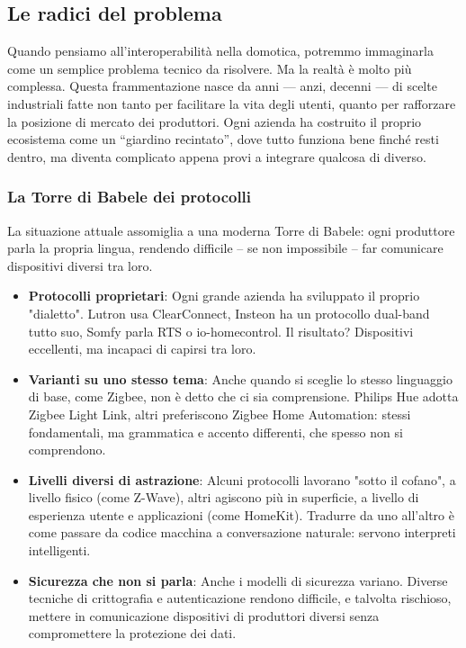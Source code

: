 \subsection{Le radici del problema}
Quando pensiamo all’interoperabilità nella domotica, potremmo immaginarla come un semplice problema tecnico da risolvere. Ma la realtà è molto più complessa. Questa frammentazione nasce da anni — anzi, decenni — di scelte industriali fatte non tanto per facilitare la vita degli utenti, quanto per rafforzare la posizione di mercato dei produttori. Ogni azienda ha costruito il proprio ecosistema come un ``giardino recintato'', dove tutto funziona bene finché resti dentro, ma diventa complicato appena provi a integrare qualcosa di diverso.

\subsubsection{La Torre di Babele dei protocolli}
La situazione attuale assomiglia a una moderna Torre di Babele: ogni produttore parla la propria lingua, rendendo difficile – se non impossibile – far comunicare dispositivi diversi tra loro.

\begin{itemize}
\item \textbf{Protocolli proprietari}: Ogni grande azienda ha sviluppato il proprio "dialetto". Lutron usa ClearConnect, Insteon ha un protocollo dual-band tutto suo, Somfy parla RTS o io-homecontrol. Il risultato? Dispositivi eccellenti, ma incapaci di capirsi tra loro.

\item \textbf{Varianti su uno stesso tema}: Anche quando si sceglie lo stesso linguaggio di base, come Zigbee, non è detto che ci sia comprensione. Philips Hue adotta Zigbee Light Link, altri preferiscono Zigbee Home Automation: stessi fondamentali, ma grammatica e accento differenti, che spesso non si comprendono.

\item \textbf{Livelli diversi di astrazione}: Alcuni protocolli lavorano "sotto il cofano", a livello fisico (come Z-Wave), altri agiscono più in superficie, a livello di esperienza utente e applicazioni (come HomeKit). Tradurre da uno all’altro è come passare da codice macchina a conversazione naturale: servono interpreti intelligenti.

\item \textbf{Sicurezza che non si parla}: Anche i modelli di sicurezza variano. Diverse tecniche di crittografia e autenticazione rendono difficile, e talvolta rischioso, mettere in comunicazione dispositivi di produttori diversi senza compromettere la protezione dei dati.
\end{itemize}

